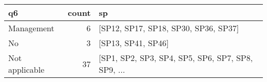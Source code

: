 \begin{tabular}{lrl}
\toprule
             q6 &  count &                                                 sp \\
\midrule
     Management &      6 &               [SP12, SP17, SP18, SP30, SP36, SP37] \\
             No &      3 &                                 [SP13, SP41, SP46] \\
 Not applicable &     37 &  [SP1, SP2, SP3, SP4, SP5, SP6, SP7, SP8, SP9, ... \\
\bottomrule
\end{tabular}
